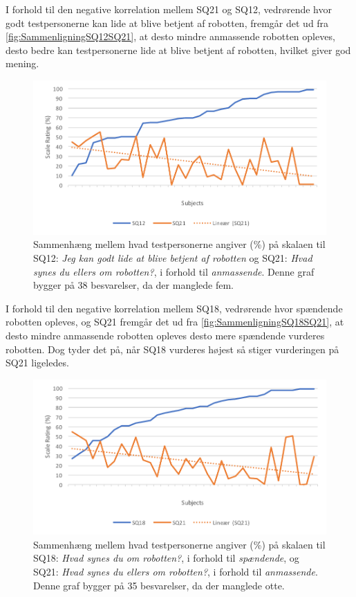 \noindent
%
I forhold til den negative korrelation mellem SQ21 og SQ12, vedrørende hvor godt testpersonerne kan lide at blive betjent af robotten, fremgår det ud fra \autoref{fig:SammenligningSQ12SQ21}, at desto mindre anmassende robotten opleves, desto bedre kan testpersonerne lide at blive betjent af robotten, hvilket giver god mening. 
%
\begin{figure}[H]
	\centering
	\includegraphics[width=\textwidth]{Figure/Korrelationsgrafer/SQ12+SQ21}
	\caption{Sammenhæng mellem hvad testpersonerne angiver (\%) på skalaen til SQ12: \textit{Jeg kan godt lide at blive betjent af robotten} og SQ21: \textit{Hvad synes du ellers om robotten?}, i forhold til \textit{anmassende}. Denne graf bygger på 38 besvarelser, da der manglede fem.}
	\label{fig:SammenligningSQ12SQ21}
\end{figure}
\noindent
%
I forhold til den negative korrelation mellem SQ18, vedrørende hvor spændende robotten opleves, og SQ21 fremgår det ud fra \autoref{fig:SammenligningSQ18SQ21}, at desto mindre anmassende robotten opleves desto mere spændende vurderes robotten. Dog tyder det på, når SQ18 vurderes højest så stiger vurderingen på SQ21 ligeledes. 
%
\begin{figure}[H]
	\centering
	\includegraphics[width=\textwidth]{Figure/Korrelationsgrafer/SQ18+SQ21}
	\caption{Sammenhæng mellem hvad testpersonerne angiver (\%) på skalaen til SQ18: \textit{Hvad synes du om robotten?}, i forhold til \textit{spændende}, og SQ21: \textit{Hvad synes du ellers om robotten?}, i forhold til \textit{anmassende}. Denne graf bygger på 35 besvarelser, da der manglede otte.}
	\label{fig:SammenligningSQ18SQ21}
\end{figure}
